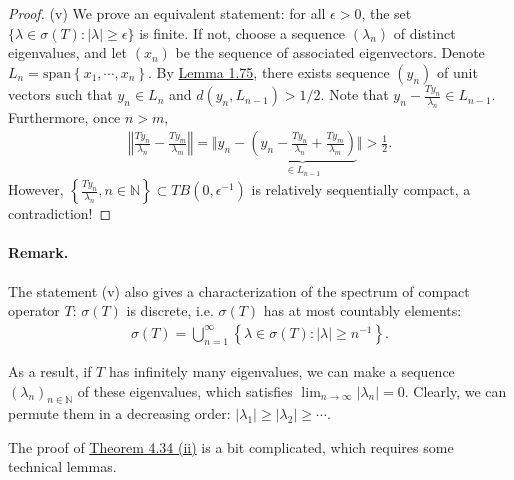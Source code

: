 \documentclass{article}
\begin{document}
\begin{proof}
(v) We prove an equivalent statement: for all $\epsilon>0$, the set $\{\lambda\in\sigma(T):\vert\lambda\vert\geq\epsilon\}$ is finite. If not, choose a sequence $(\lambda_n)$ of distinct eigenvalues, and let $(x_n)$ be the sequence of associated eigenvectors. Denote $L_n=\mathrm{span}\left\{x_1,\cdots,x_n\right\}$. By \hyperref[lemma:1.75]{Lemma 1.75}, there exists sequence $(y_n)$ of unit vectors such that $y_n\in L_n$ and $d(y_n,L_{n-1})>1/2$. Note that $y_n - \frac{Ty_n}{\lambda_n}\in L_{n-1}$. Furthermore, once $n>m$,
\begin{align*}
	\left\Vert\frac{Ty_n}{\lambda_n} - \frac{Ty_m}{\lambda_m}\right\Vert = \biggl\Vert y_n - \underbrace{\left(y_n - \frac{Ty_n}{\lambda_n} + \frac{Ty_m}{\lambda_m}\right)}_{\in L_{n-1}}\biggr\Vert > \frac{1}{2}.
\end{align*}
However, $\left\{\frac{Ty_n}{\lambda_n},n\in\mathbb{N}\right\}\subset TB(0,\epsilon^{-1})$ is relatively sequentially compact, a contradiction!
\end{proof}

\paragraph{Remark.} The statement (v) also gives a characterization of the spectrum of compact operator $T$: $\sigma(T)$ is discrete, i.e. $\sigma(T)$ has at most countably elements:
\begin{align*}
	\sigma(T) = \bigcup_{n=1}^\infty\left\{\lambda\in\sigma(T):\vert\lambda\vert\geq n^{-1}\right\}.
\end{align*}

As a result, if $T$ has infinitely many eigenvalues, we can make a sequence $(\lambda_n)_{n\in\mathbb{N}}$ of these eigenvalues, which satisfies $\lim_{n\to\infty}\vert\lambda_n\vert = 0$. Clearly, we can permute them in a decreasing order: $\vert\lambda_1\vert\geq\vert\lambda_2\vert\geq\cdots$. 


The proof of \hyperref[thm:4.34]{Theorem 4.34 (ii)} is a bit complicated, which requires some technical lemmas.
\end{document}
